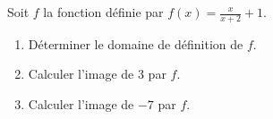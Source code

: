 
Soit $f$ la fonction définie par $f(x)=\frac{x}{x+2}+1$.
\begin{enumerate}
\item Déterminer le domaine de définition de $f$.
\item Calculer l'image de 3 par $f$.
\item Calculer l'image de $-7$ par $f$.
\end{enumerate}